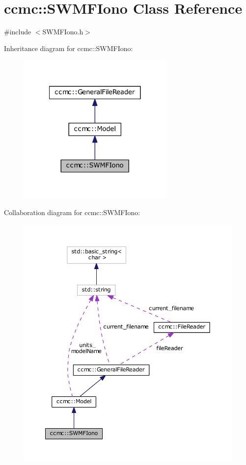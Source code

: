 \hypertarget{classccmc_1_1_s_w_m_f_iono}{\section{ccmc\-:\-:S\-W\-M\-F\-Iono Class Reference}
\label{classccmc_1_1_s_w_m_f_iono}
}


{\ttfamily \#include $<$S\-W\-M\-F\-Iono.\-h$>$}



Inheritance diagram for ccmc\-:\-:S\-W\-M\-F\-Iono\-:
\nopagebreak
\begin{figure}[H]
\begin{center}
\leavevmode
\includegraphics[width=218pt]{classccmc_1_1_s_w_m_f_iono__inherit__graph}
\end{center}
\end{figure}


Collaboration diagram for ccmc\-:\-:S\-W\-M\-F\-Iono\-:
\nopagebreak
\begin{figure}[H]
\begin{center}
\leavevmode
\includegraphics[width=350pt]{classccmc_1_1_s_w_m_f_iono__coll__graph}
\end{center}
\end{figure}
